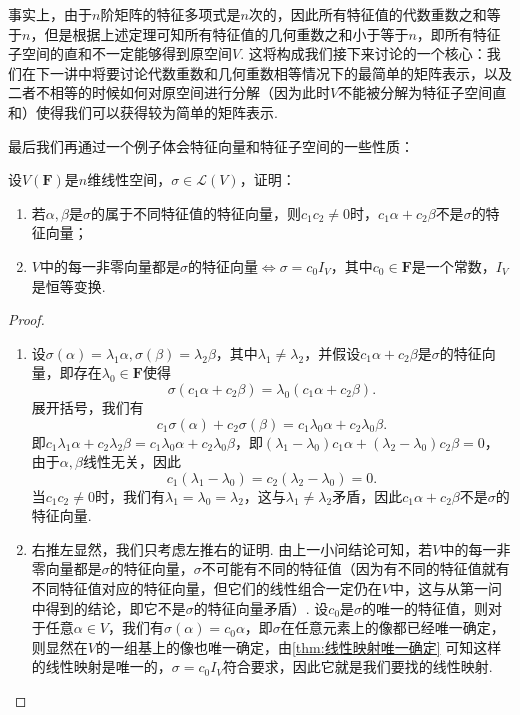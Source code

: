 事实上，由于$n$阶矩阵的特征多项式是$n$次的，因此所有特征值的代数重数之和等于$n$，但是根据上述定理可知所有特征值的几何重数之和小于等于$n$，即所有特征子空间的直和不一定能够得到原空间$V$. 这将构成我们接下来讨论的一个核心：我们在下一讲中将要讨论代数重数和几何重数相等情况下的最简单的矩阵表示，以及二者不相等的时候如何对原空间进行分解（因为此时$V$不能被分解为特征子空间直和）使得我们可以获得较为简单的矩阵表示.

最后我们再通过一个例子体会特征向量和特征子空间的一些性质：
\begin{example}{}{}
    设$V(\mathbf{F})$是$n$维线性空间，$\sigma\in \mathcal{L}(V)$，证明：
    \begin{enumerate}
        \item 若$\alpha,\beta$是$\sigma$的属于不同特征值的特征向量，则$c_1c_2\neq 0$时，$c_1\alpha+c_2\beta$不是$\sigma$的特征向量；

        \item $V$中的每一非零向量都是$\sigma$的特征向量$\iff\sigma=c_0I_V$，其中$c_0\in\mathbf{F}$是一个常数，$I_V$是恒等变换.
    \end{enumerate}
\end{example}

\begin{proof}
    \begin{enumerate}
        \item 设$\sigma(\alpha)=\lambda_1\alpha,\sigma(\beta)=\lambda_2\beta$，其中$\lambda_1\neq\lambda_2$，并假设$c_1\alpha+c_2\beta$是$\sigma$的特征向量，即存在$\lambda_0\in\mathbf{F}$使得
              \[\sigma(c_1\alpha+c_2\beta)=\lambda_0(c_1\alpha+c_2\beta).\]
              展开括号，我们有
              \[c_1\sigma(\alpha)+c_2\sigma(\beta)=c_1\lambda_0\alpha+c_2\lambda_0\beta.\]
              即$c_1\lambda_1\alpha+c_2\lambda_2\beta=c_1\lambda_0\alpha+c_2\lambda_0\beta$，即$(\lambda_1-\lambda_0)c_1\alpha+(\lambda_2-\lambda_0)c_2\beta=0$，由于$\alpha,\beta$线性无关，因此
              \[c_1(\lambda_1-\lambda_0)=c_2(\lambda_2-\lambda_0)=0.\]
              当$c_1c_2\neq 0$时，我们有$\lambda_1=\lambda_0=\lambda_2$，这与$\lambda_1\neq\lambda_2$矛盾，因此$c_1\alpha+c_2\beta$不是$\sigma$的特征向量.

        \item 右推左显然，我们只考虑左推右的证明. 由上一小问结论可知，若$V$中的每一非零向量都是$\sigma$的特征向量，$\sigma$不可能有不同的特征值（因为有不同的特征值就有不同特征值对应的特征向量，但它们的线性组合一定仍在$V$中，这与从第一问中得到的结论，即它不是$\sigma$的特征向量矛盾）. 设$c_0$是$\sigma$的唯一的特征值，则对于任意$\alpha\in V$，我们有$\sigma(\alpha)=c_0\alpha$，即$\sigma$在任意元素上的像都已经唯一确定，则显然在$V$的一组基上的像也唯一确定，由\autoref{thm:线性映射唯一确定} 可知这样的线性映射是唯一的，$\sigma=c_0I_V$符合要求，因此它就是我们要找的线性映射.
    \end{enumerate}
\end{proof}

